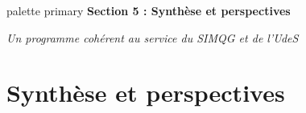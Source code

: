 \documentclass[aspectratio=169,11pt]{beamer}
\begin{document}
\begin{frame}{}
  \begin{beamercolorbox}[wd=\paperwidth,ht=2.5cm,dp=0.5cm,center]{palette primary}
    {\Large\bfseries Section 5 : Synthèse et perspectives}
  \end{beamercolorbox}
  \vspace{2cm}
  \begin{center}
    {\large\textit{Un programme cohérent au service du SIMQG et de l'UdeS}}
  \end{center}
\end{frame}

\section{Synthèse et perspectives}
\end{document}
